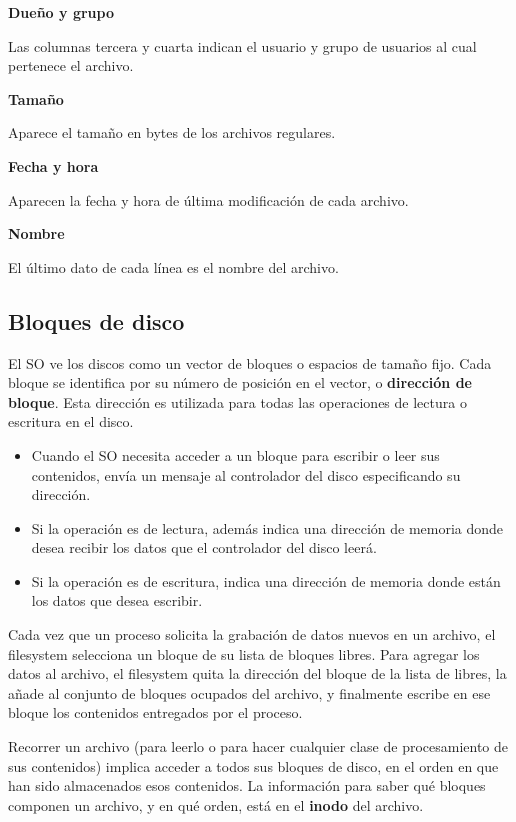 \documentclass[spanish,A4,]{article}
\begin{document}
\textbf{Dueño y grupo}

Las columnas tercera y cuarta indican el usuario y grupo de usuarios al
cual pertenece el archivo.

\textbf{Tamaño}

Aparece el tamaño en bytes de los archivos regulares.

\textbf{Fecha y hora}

Aparecen la fecha y hora de última modificación de cada archivo.

\textbf{Nombre}

El último dato de cada línea es el nombre del archivo.

\subsection{Bloques de disco}\label{bloques-de-disco}

El SO ve los discos como un vector de bloques o espacios de tamaño fijo.
Cada bloque se identifica por su número de posición en el vector, o
\textbf{dirección de bloque}. Esta dirección es utilizada para todas las
operaciones de lectura o escritura en el disco.

\begin{itemize}
\itemsep1pt\parskip0pt
\item
  Cuando el SO necesita acceder a un bloque para escribir o leer sus
  contenidos, envía un mensaje al controlador del disco especificando su
  dirección.
\item
  Si la operación es de lectura, además indica una dirección de memoria
  donde desea recibir los datos que el controlador del disco leerá.
\item
  Si la operación es de escritura, indica una dirección de memoria donde
  están los datos que desea escribir.
\end{itemize}

Cada vez que un proceso solicita la grabación de datos nuevos en un
archivo, el filesystem selecciona un bloque de su lista de bloques
libres. Para agregar los datos al archivo, el filesystem quita la
dirección del bloque de la lista de libres, la añade al conjunto de
bloques ocupados del archivo, y finalmente escribe en ese bloque los
contenidos entregados por el proceso.

Recorrer un archivo (para leerlo o para hacer cualquier clase de
procesamiento de sus contenidos) implica acceder a todos sus bloques de
disco, en el orden en que han sido almacenados esos contenidos. La
información para saber qué bloques componen un archivo, y en qué orden,
está en el \textbf{inodo} del archivo.
\end{document}
